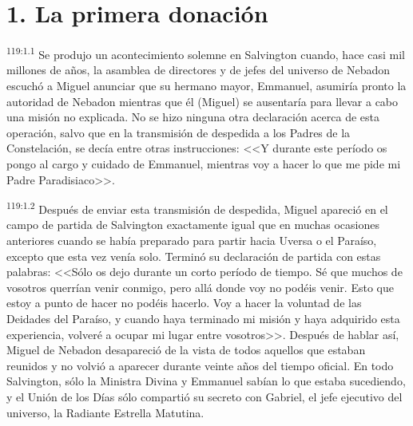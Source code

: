 \section*{1. La primera donación}
\par
\textsuperscript{119:1.1} Se produjo un acontecimiento solemne en Salvington cuando, hace casi mil millones de años, la asamblea de directores y de jefes del universo de Nebadon escuchó a Miguel anunciar que su hermano mayor, Emmanuel, asumiría pronto la autoridad de Nebadon mientras que él (Miguel) se ausentaría para llevar a cabo una misión no explicada. No se hizo ninguna otra declaración acerca de esta operación, salvo que en la transmisión de despedida a los Padres de la Constelación, se decía entre otras instrucciones: <<Y durante este período os pongo al cargo y cuidado de Emmanuel, mientras voy a hacer lo que me pide mi Padre Paradisiaco>>.

\par
\textsuperscript{119:1.2} Después de enviar esta transmisión de despedida, Miguel apareció en el campo de partida de Salvington exactamente igual que en muchas ocasiones anteriores cuando se había preparado para partir hacia Uversa o el Paraíso, excepto que esta vez venía solo. Terminó su declaración de partida con estas palabras: <<Sólo os dejo durante un corto período de tiempo. Sé que muchos de vosotros querrían venir conmigo, pero allá donde voy no podéis venir. Esto que estoy a punto de hacer no podéis hacerlo. Voy a hacer la voluntad de las Deidades del Paraíso, y cuando haya terminado mi misión y haya adquirido esta experiencia, volveré a ocupar mi lugar entre vosotros>>. Después de hablar así, Miguel de Nebadon desapareció de la vista de todos aquellos que estaban reunidos y no volvió a aparecer durante veinte años del tiempo oficial. En todo Salvington, sólo la Ministra Divina y Emmanuel sabían lo que estaba sucediendo, y el Unión de los Días sólo compartió su secreto con Gabriel, el jefe ejecutivo del universo, la Radiante Estrella Matutina.

